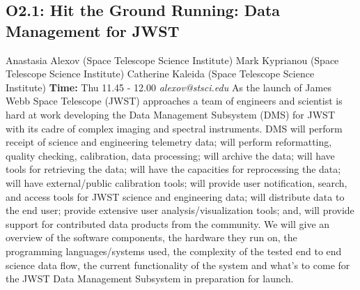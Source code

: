 \documentclass{report}
\begin{document}
\subsection*{O2.1: Hit the Ground Running: Data Management for JWST}
\bigskip
Anastasia Alexov (Space Telescope Science Institute) \newline Mark Kyprianou (Space Telescope Science Institute) \newline  Catherine Kaleida (Space Telescope Science Institute)\newline   \newline  \newline  \newline\newline
{\bf Time:} Thu 11.45 - 12.00\newline
\newline
{\it alexov@stsci.edu}\newline
\newline\newline
As the launch of James Webb Space Telescope (JWST) approaches a team of engineers and scientist is hard at work developing the Data Management Subsystem (DMS) for JWST with its cadre of complex imaging and spectral instruments.  DMS will perform receipt of science and engineering telemetry data; will perform reformatting, quality checking, calibration, data processing; will archive the data; will have tools for retrieving the data;  will have the capacities for reprocessing the data; will have external/public calibration tools; will provide user notification, search, and access tools for JWST science and engineering data;  will distribute data to the end user; provide extensive user analysis/visualization tools; and, will provide support for contributed data products from the community. We will give an overview of the software components, the hardware they run on, the programming languages/systems used, the complexity of the tested end to end science data flow, the current functionality of the system and what's to come for the JWST Data Management Subsystem in preparation for launch.\newline
\newpage
\end{document}
